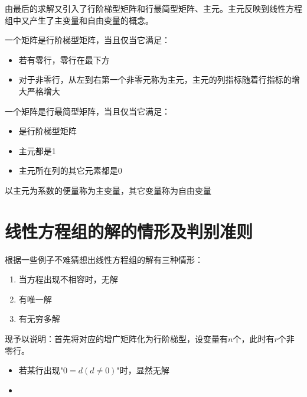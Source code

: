 由最后的求解又引入了行阶梯型矩阵和行最简型矩阵、主元。主元反映到线性方程组中又产生了主变量和自由变量的概念。
\begin{definition}[行阶梯形矩阵]
    一个矩阵是行阶梯型矩阵，当且仅当它满足：
    \begin{itemize}
        \item 若有零行，零行在最下方
        \item 对于非零行，从左到右第一个非零元称为主元，主元的列指标随着行指标的增大严格增大
    \end{itemize}
\end{definition}
\begin{definition}[行最简型矩阵]
    一个矩阵是行最简型矩阵，当且仅当它满足：
    \begin{itemize}
        \item 是行阶梯型矩阵
        \item 主元都是1
        \item 主元所在列的其它元素都是0
    \end{itemize}
\end{definition}
\begin{definition}[主变量]
    以主元为系数的便量称为主变量，其它变量称为自由变量
\end{definition}

\section{线性方程组的解的情形及判别准则}
根据一些例子不难猜想出线性方程组的解有三种情形：
\begin{enumerate}
    \item 当方程出现不相容时，无解
    \item 有唯一解
    \item 有无穷多解
\end{enumerate}
现予以说明：首先将对应的增广矩阵化为行阶梯型，设变量有$n$个，此时有$r$个非零行。
\begin{itemize}
    \item 若某行出现"$0=d(d\neq 0)$"时，显然无解
    \item 
\end{itemize}